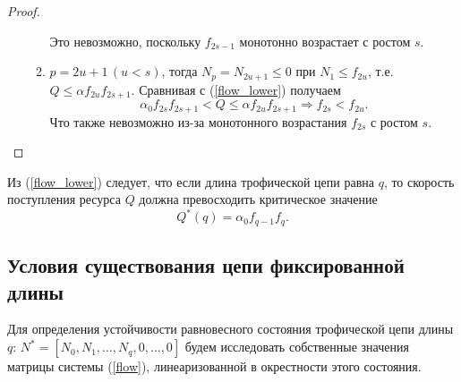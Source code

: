 \begin{proof}
\begin{enumerate}
\begin{enumerate}
                Это невозможно, поскольку \(f_{2s-1}\) монотонно возрастает с ростом \(s\).

                \item \(p = 2u+1 \, (u < s)\), тогда \( N_p = N_{2u+1} \leq 0 \) при \(N_1 \leq f_{2u}\), т.е. \( Q \leq \alpha f_{2u} f_{2s+1} \). Сравнивая с (\ref{flow_lower}) получаем
                \begin{equation*}
                    \alpha_0 f_{2s} f_{2s+1} < Q \leq \alpha f_{2u} f_{2s+1} \Rightarrow f_{2s} < f_{2u}.
                \end{equation*}
                Что также невозможно из-за монотонного возрастания \(f_{2s}\) с ростом \(s\). 
            \end{enumerate}
        \end{enumerate}
    \end{proof}
    
    \begin{corollary}
        Из (\ref{flow_lower}) следует, что если длина трофической цепи равна \(q\), то скорость поступления ресурса \( Q \) должна превосходить критическое значение 
        \begin{equation*}
            Q^* (q) = \alpha_0 f_{q-1} f_{q}.
        \end{equation*}
    \end{corollary}

\subsection{Условия существования цепи фиксированной длины}

    Для определения устойчивости равновесного состояния трофической цепи длины \(q\): \(N^* = [ N_0, N_1, \dots, N_q, 0, \dots, 0 ]\) будем исследовать собственные значения матрицы системы (\ref{flow}), линеаризованной в окрестности этого состояния.
    
